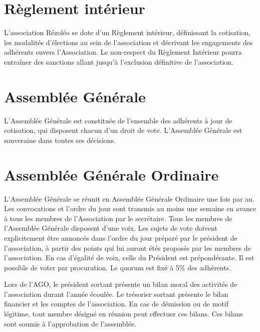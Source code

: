 \documentclass[12pt]{constitution}
\begin{document}
	
	\section{Règlement intérieur}
L'association Rézoléo se dote d’un Règlement intérieur, définissant la cotisation, les modalités d'élections au sein de l'association et décrivant les engagements des adhérents envers l’Association. Le non-respect du Règlement Intérieur pourra entraîner des sanctions allant jusqu’à l’exclusion définitive de l’association.
	
	\section{Assemblée Générale}
	
	L’Assemblée Générale est constituée de l’ensemble des adhérents à jour de cotisation, qui disposent chacun d’un droit de vote. L’Assemblée Générale est souveraine dans toutes ses décisions.
	
	\section{Assemblée Générale Ordinaire}
	
	L'Assemblée Générale se réunit en Assemblée Générale Ordinaire une fois par an. Les convocations et l’ordre du jour sont transmis au moins une semaine en avance à tous les membres de l’Association par le secrétaire. Tous les membres de l'Assemblée Générale disposent d’une voix. Les sujets de vote doivent explicitement être annoncés dans l’ordre du jour préparé par le président de l'association, à partir des points qui lui auront étés proposés par les membres de l'association. En cas d’égalité de voix, celle du Président est prépondérante. Il est possible de voter par procuration. Le quorum est fixé à 5\% des adhérents. 
	
	Lors de l'AGO, le président sortant présente un bilan moral des activités de l’association durant l’année écoulée. Le trésorier sortant présente le bilan financier et les comptes de l’association. En cas de démission ou de motif légitime, tout membre désigné en réunion peut effectuer ces bilans. Ces bilans sont soumis à l’approbation de l’assemblée.
	
\end{document}
